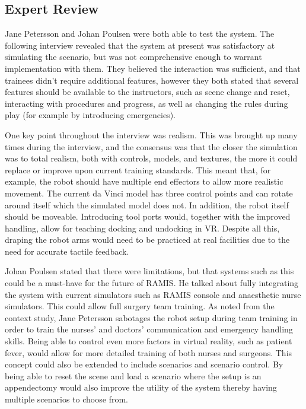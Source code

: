 \subsection*{Expert Review}
Jane Petersson and Johan Poulsen were both able to test the system. The following interview revealed that the system at present was satisfactory at simulating the scenario, but was not comprehensive enough to warrant implementation with them. They believed the interaction was sufficient, and that trainees didn’t require additional features, however they both stated that several features should be available to the instructors, such as scene change and reset, interacting with procedures and progress, as well as changing the rules during play (for example by introducing emergencies).

One key point throughout the interview was realism. This was brought up many times during the interview, and the consensus was that the closer the simulation was to total realism, both with controls, models, and textures, the more it could replace or improve upon current training standards. This meant that, for example, the robot should have multiple end effectors to allow more realistic movement. The current da Vinci model has three control points and can rotate around itself which the simulated model does not. In addition, the robot itself should be moveable. Introducing tool ports would, together with the improved handling, allow for teaching docking and undocking in VR. Despite all this, draping the robot arms would need to be practiced at real facilities due to the need for accurate tactile feedback.

Johan Poulsen stated that there were limitations, but that systems such as this could be a must-have for the future of RAMIS. He talked about fully integrating the system with current simulators such as RAMIS console and anaesthetic nurse simulators. This could allow full surgery team training. As noted from the context study, Jane Petersson sabotages the robot setup during team training in order to train the nurses’ and doctors’ communication and emergency handling skills. Being able to control even more factors in virtual reality, such as patient fever, would allow for more detailed training of both nurses and surgeons. This concept could also be extended to include scenarios and scenario control. By being able to reset the scene and load a scenario where the setup is an appendectomy would also improve the utility of the system thereby having multiple scenarios to choose from.

